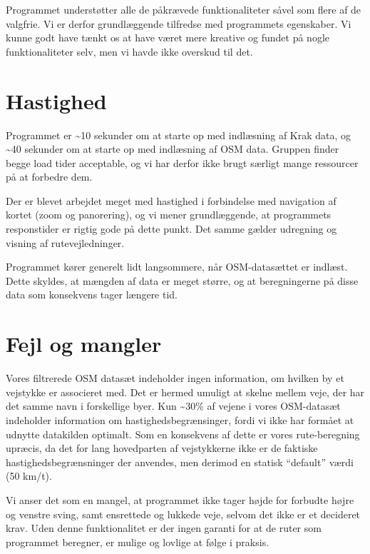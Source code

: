Programmet understøtter alle de påkrævede funktionaliteter såvel som flere af de valgfrie. Vi er derfor grundlæggende tilfredse med programmets egenskaber. Vi kunne godt have tænkt os at have været mere kreative og fundet på nogle funktionaliteter selv, men vi havde ikke overskud til det.

\section{Hastighed}
\label{sec:hastighed}

Programmet er \textasciitilde10 sekunder om at starte op med indlæsning af Krak data, og \textasciitilde40 sekunder om at starte op med indlæsning af OSM data. Gruppen finder begge load tider acceptable, og vi har derfor ikke brugt særligt mange ressourcer på at forbedre dem.

Der er blevet arbejdet meget med hastighed i forbindelse med navigation af kortet (zoom og panorering), og vi mener grundlæggende, at programmets responstider er rigtig gode på dette punkt. Det samme gælder udregning og visning af rutevejledninger.

Programmet kører generelt lidt langsommere, når OSM-datasættet er indlæst. Dette skyldes, at mængden af data er meget større, og at beregningerne på disse data som konsekvens tager længere tid.

\section{Fejl og mangler}
\label{sec:fejlOgMangler}

Vores filtrerede OSM datasæt indeholder ingen information, om hvilken by et vejstykke er associeret med. Det er hermed umuligt at skelne mellem veje, der har det samme navn i forskellige byer. Kun \textasciitilde30\% af vejene i vores OSM-datasæt indeholder information om hastighedsbegrænsinger, fordi vi ikke har formået at udnytte datakilden optimalt. Som en konsekvens af dette er vores rute-beregning upræcis, da det for lang hovedparten af vejstykkerne ikke er de faktiske hastighedsbegrænsninger der anvendes, men derimod en statisk ``default'' værdi (50 km/t).

Vi anser det som en mangel, at programmet ikke tager højde for forbudte højre og venstre sving, samt ensrettede og lukkede veje, selvom det ikke er et decideret krav. Uden denne funktionalitet er der ingen garanti for at de ruter som programmet beregner, er mulige og lovlige at følge i praksis.

